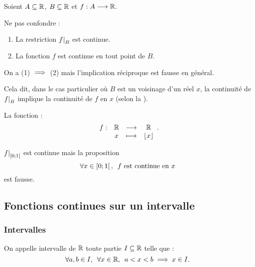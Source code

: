 \begin{rem}
Soient \(A\subseteq\mathbb{R}\), \(B\subseteq\mathbb{R}\) et \(f:A\longrightarrow\mathbb{R}\).

Ne pas confondre :

\begin{enumerate}
\item La restriction \(\restr{f}{B}\) est continue. \\

\item La fonction \(f\) est continue en tout point de \(B\).
\end{enumerate}

On a (1) \(\implies\) (2) mais l'implication réciproque est fausse en général.

Cela dit, dans le cas particulier où \(B\) est un voisinage d'un réel \(x\), la continuité de \(\restr{f}{B}\) implique la continuité de \(f\) en \(x\) (selon la ).
\end{rem}

\begin{ex}
La fonction  : \[\begin{array}[t]{cccc}f : & \mathbb{R} & \longrightarrow & \mathbb{R} \\ & x & \longmapsto & \left\lfloor x\right\rfloor\end{array}.\]

\(\restr{f}{\intervie{0}{1}}\) est continue mais la proposition \[\quantifs{\forall x\in\intervie{0}{1}}f\text{ est continue en }x\] est fausse.
\end{ex}

\subsection{Fonctions continues sur un intervalle}

\subsubsection{Intervalles}

\begin{rappel}
On appelle intervalle de \(\mathbb{R}\) toute partie \(I\subseteq\mathbb{R}\) telle que : \[\quantifs{\forall a,b\in I;\forall x\in\R}a<x<b\imp x\in I.\]
\end{rappel}

